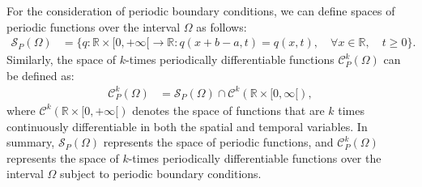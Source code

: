 For the consideration of periodic boundary conditions, we can define spaces of periodic functions over 
the interval $\Omega$ as follows:
\begin{align*}
	\mathcal{S}_P(\Omega) &= \{q:\mathbb{R}\times[0,+\infty[\to \mathbb{R}: q(x+b-a,t)=q(x,t), \quad \forall x \in \mathbb{R}, \quad t\geq0\}.
\end{align*}
Similarly, the space of $k$-times periodically differentiable functions $\mathcal{C}_P^k(\Omega)$ can be defined as:
\begin{align*}
	\mathcal{C}_P^k(\Omega) &= \mathcal{S}_P(\Omega)\cap \mathcal{C}^k(\mathbb{R}\times[0,\infty[),
\end{align*}
where $\mathcal{C}^k(\mathbb{R}\times[0,+\infty[)$ denotes the space of functions that are $k$ 
times continuously differentiable in both the spatial and temporal variables.
In summary, $\mathcal{S}_P(\Omega)$ represents the space of periodic functions, and $\mathcal{C}_P^k(\Omega)$
represents the space of $k$-times periodically differentiable functions over the interval $\Omega$ subject to periodic boundary conditions.

